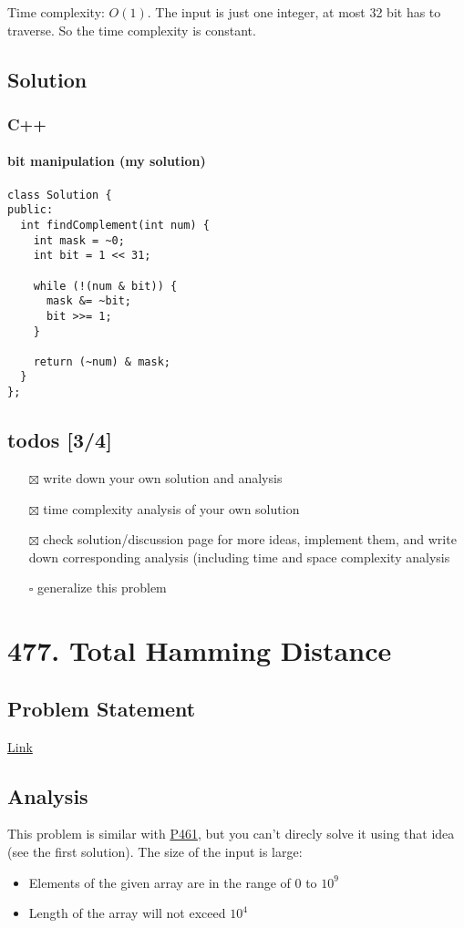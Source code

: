 \documentclass[11pt]{article}
\begin{document}
Time complexity: \(O(1)\). The input is just one integer, at most 32 bit has to traverse. So the time complexity is constant.
\subsection{Solution}
\label{sec:org32fe7ab}
\subsubsection{C++}
\label{sec:orgeeabdd7}
\paragraph{bit manipulation (my solution)}
\label{sec:org318d832}
\begin{verbatim}
class Solution {
public:
  int findComplement(int num) {
    int mask = ~0;
    int bit = 1 << 31;

    while (!(num & bit)) {
      mask &= ~bit;
      bit >>= 1;
    }

    return (~num) & mask;
  }
};
\end{verbatim}
\subsection{todos [3/4]}
\label{sec:orgdfd676a}
\begin{itemize}
\item[{$\boxtimes$}] write down your own solution and analysis
\item[{$\boxtimes$}] time complexity analysis of your own solution
\item[{$\boxtimes$}] check solution/discussion page for more ideas, implement them, and write down corresponding analysis (including time and space complexity analysis
\item[{$\square$}] generalize this problem
\end{itemize}
\section{477. Total Hamming Distance}
\label{sec:orgff67726}
\subsection{Problem Statement}
\label{sec:orgfa4a039}
\href{https://leetcode.com/problems/total-hamming-distance/}{Link}
\subsection{Analysis}
\label{sec:org0fdee31}
This problem is similar with \hyperref[org12406d9]{P461}, but you can't direcly solve it using that idea (see the first solution). The size of the input is large:
\begin{itemize}
\item Elements of the given array are in the range of \(0\) to \(10^9\)
\item Length of the array will not exceed \(10^4\)
\end{itemize}
\end{document}
